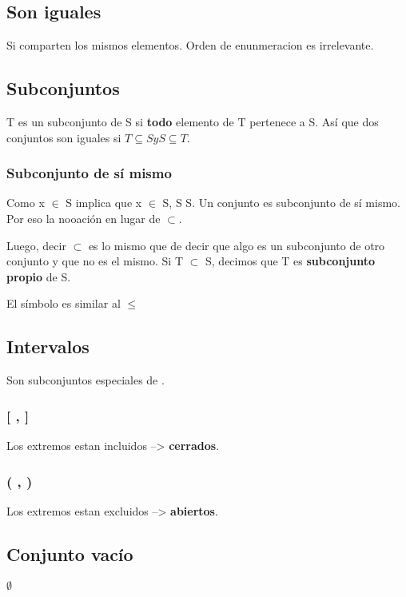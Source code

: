 \documentclass[11pt]{article}
\begin{document}
\subsection{Son iguales}
\label{sec-1-6}
Si comparten los mismos elementos. 
Orden de enunmeracion es irrelevante.

\subsection{Subconjuntos}
\label{sec-1-7}
T es un subconjunto de S si \textbf{todo} elemento de T pertenece a S. 
Así que dos conjuntos son iguales si \( T \subseteq S y S \subseteq T\).

\subsubsection{Subconjunto de sí mismo}
\label{sec-1-7-1}

Como x $\in$ S implica que x $\in$ S, S \subseteq S. Un conjunto 
es subconjunto de sí mismo. Por eso la nooación \subseteq  en lugar de $\subset$.

Luego, decir $\subset$ es lo mismo que de decir que algo es un subconjunto de otro conjunto y que no es el mismo.
Si T $\subset$ S, decimos que T es \textbf{subconjunto propio} de S. 

El símbolo \subseteq es similar al $\le$

\subsection{Intervalos}
\label{sec-1-8}
Son subconjuntos especiales de \R.
\subsubsection{[ , ]}
\label{sec-1-8-1}
Los extremos estan incluidos --> \textbf{cerrados}.
\subsubsection{( , )}
\label{sec-1-8-2}
Los extremos estan excluidos --> \textbf{abiertos}.

\subsection{Conjunto vacío}
\label{sec-1-9}
$\emptyset$
\end{document}

